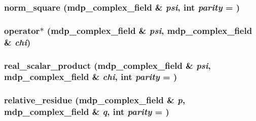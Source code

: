 \label{classmdp__complex__field_adebe165924543c988d0c7e86da4b2eb3}
\hypertarget{classmdp__complex__field_a81ccdc6212b7084b9fe17249438abe6e}{
\subsubsection[{norm\_\-square}]{ norm\_\-square ({\bf mdp\_\-complex\_\-field} \& {\em psi}, \/  int {\em parity} = {})}}
\label{classmdp__complex__field_a81ccdc6212b7084b9fe17249438abe6e}
\hypertarget{classmdp__complex__field_a11f474ce79caba1227bcf83b2be3424c}{
\subsubsection[{operator$\ast$}]{ operator$\ast$ ({\bf mdp\_\-complex\_\-field} \& {\em psi}, \/  {\bf mdp\_\-complex\_\-field} \& {\em chi})}}
\label{classmdp__complex__field_a11f474ce79caba1227bcf83b2be3424c}
\hypertarget{classmdp__complex__field_a0d9771f5d1f057270e5568519a796a0c}{
\subsubsection[{real\_\-scalar\_\-product}]{ real\_\-scalar\_\-product ({\bf mdp\_\-complex\_\-field} \& {\em psi}, \/  {\bf mdp\_\-complex\_\-field} \& {\em chi}, \/  int {\em parity} = {})}}
\label{classmdp__complex__field_a0d9771f5d1f057270e5568519a796a0c}
\hypertarget{classmdp__complex__field_a0936375b6edd3f01728d16ac38c76c32}{
\subsubsection[{relative\_\-residue}]{ relative\_\-residue ({\bf mdp\_\-complex\_\-field} \& {\em p}, \/  {\bf mdp\_\-complex\_\-field} \& {\em q}, \/  int {\em parity} = {})}}
